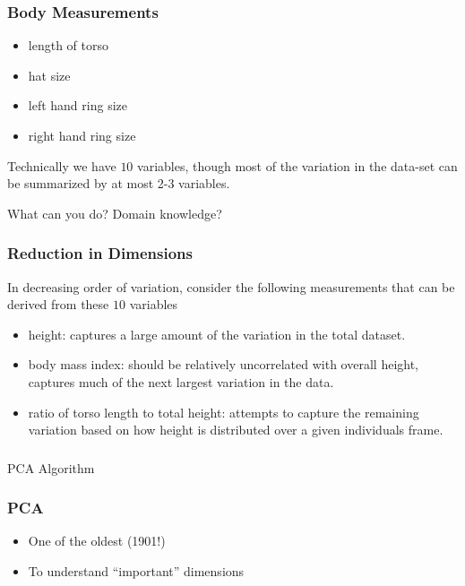 \begin{frame}[fragile] \frametitle{Body Measurements}
\begin{itemize}
\item length of torso
\item hat size
\item left hand ring size
\item right hand ring size
\end{itemize}
Technically we have $10$ variables, though most of the variation
in the data-set can be summarized by at most 2-3 variables.

What can you do? Domain knowledge?
\end{frame}

\begin{frame}[fragile] \frametitle{Reduction in Dimensions} 
In decreasing order of variation, consider the following measurements
that can be derived from these $10$ variables
\begin{itemize}
\item height: captures a large amount of the variation in the total
dataset. 
\item body mass index: should be
relatively uncorrelated with overall height, captures much of the
next largest variation in the data. 
\item ratio of torso length to total height: attempts
to capture the remaining variation based on how height is distributed
over a given individuals frame.
\end{itemize}
\end{frame}

\begin{frame}[fragile]\frametitle{}
\begin{center}
{\Large PCA Algorithm}
\end{center}
\end{frame}

\begin{frame}[fragile] \frametitle{PCA} 
\begin{itemize}
\item One of the oldest (1901!) 
\item To understand ``important'' dimensions
\end{itemize}
\end{frame}

